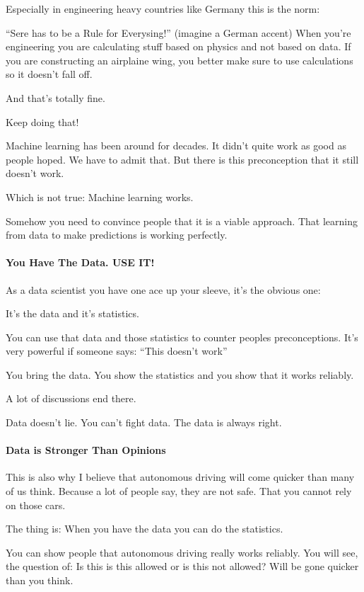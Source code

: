 \documentclass[12pt]{scrartcl} %
\begin{document}
Especially in engineering heavy countries like Germany this is the norm:

“Sere has to be a Rule for Everysing!” (imagine a German accent)
When you’re engineering you are calculating stuff based on physics and not based on data. If you are constructing an airplaine wing, you better make sure to use calculations so it doesn’t fall off.

And that’s totally fine.

Keep doing that!

Machine learning has been around for decades. It didn’t quite work as good as people hoped. We have to admit that. But there is this preconception that it still doesn’t work.

Which is not true: Machine learning works.

Somehow you need to convince people that it is a viable approach. That learning from data to make predictions is working perfectly.

\paragraph{You Have The Data. USE IT!}

As a data scientist you have one ace up your sleeve, it’s the obvious one:

It’s the data and it’s statistics.

You can use that data and those statistics to counter peoples preconceptions. It’s very powerful if someone says: “This doesn’t work”

You bring the data. You show the statistics and you show that it works reliably.

A lot of discussions end there.

Data doesn’t lie. You can’t fight data.
The data is always right.

\paragraph{Data is Stronger Than Opinions}

This is also why I believe that autonomous driving will come quicker than many of us think. Because a lot of people say, they are not safe. That you cannot rely on those cars.

The thing is: When you have the data you can do the statistics.

You can show people that autonomous driving really works reliably. You will see, the question of: Is this is this allowed or is this not allowed? Will be gone quicker than you think.
\end{document}
